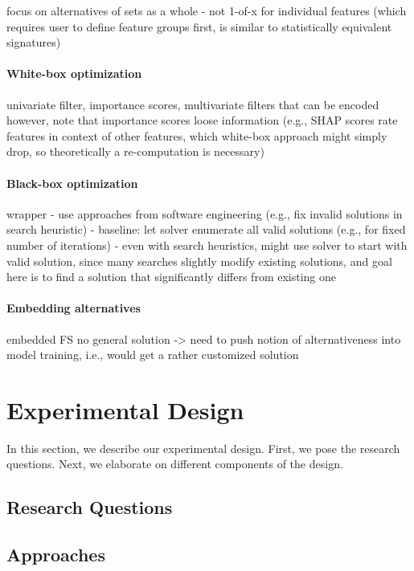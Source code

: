 \documentclass{article}
\theoremstyle{definition}
\begin{document}
focus on alternatives of sets as a whole - not 1-of-x for individual features (which requires user to define feature groups first, is similar to statistically equivalent signatures)

\paragraph{White-box optimization}

univariate filter, importance scores, multivariate filters that can be encoded
however, note that importance scores loose information (e.g., SHAP scores rate features in context of other features, which white-box approach might simply drop, so theoretically a re-computation is necessary)

\paragraph{Black-box optimization}

wrapper
- use approaches from software engineering (e.g., fix invalid solutions in search heuristic)
- baseline: let solver enumerate all valid solutions (e.g., for fixed number of iterations)
- even with search heuristics, might use solver to start with valid solution, since many searches slightly modify existing solutions, and goal here is to find a solution that significantly differs from existing one

\paragraph{Embedding alternatives}

embedded FS
no general solution -> need to push notion of alternativeness into model training, i.e., would get a rather customized solution

\section{Experimental Design}
\label{sec:experimental-design}

In this section, we describe our experimental design.
First, we pose the research questions.
Next, we elaborate on different components of the design.

\subsection{Research Questions}

\subsection{Approaches}
\end{document}
